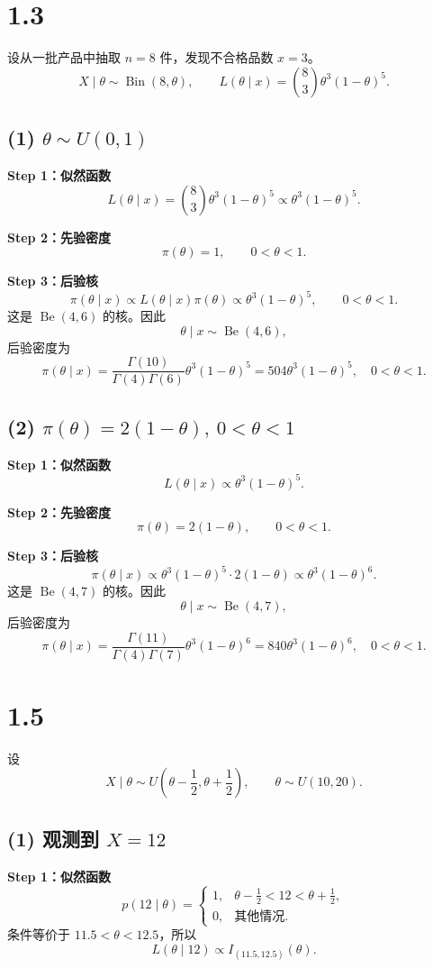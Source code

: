 \documentclass[UTF8,zihao=-4]{ctexart}
\begin{document}
\section*{1.3}
设从一批产品中抽取 \(n=8\) 件，发现不合格品数 \(x=3\)。
\[
X\mid\theta\sim\operatorname{Bin}(8,\theta),\qquad
L(\theta\mid x)=\binom{8}{3}\theta^3(1-\theta)^5.
\]

\subsection*{(1) \(\theta\sim U(0,1)\)}
\textbf{Step 1：似然函数}
\[
L(\theta\mid x)=\binom{8}{3}\theta^3(1-\theta)^5
\propto\theta^3(1-\theta)^5.
\]

\textbf{Step 2：先验密度}
\[
\pi(\theta)=1,\qquad0<\theta<1.
\]

\textbf{Step 3：后验核}
\[
\pi(\theta\mid x)\propto L(\theta\mid x)\pi(\theta)
\propto\theta^3(1-\theta)^5,\qquad0<\theta<1.
\]
这是 \(\operatorname{Be}(4,6)\) 的核。因此
\[
\boxed{\theta\mid x\sim\operatorname{Be}(4,6)},
\]
后验密度为
\[
\boxed{\pi(\theta\mid x)=\frac{\Gamma(10)}{\Gamma(4)\Gamma(6)}
\theta^3(1-\theta)^5=504\theta^3(1-\theta)^5,\quad0<\theta<1.}
\]

\subsection*{(2) \(\pi(\theta)=2(1-\theta),\ 0<\theta<1\)}
\textbf{Step 1：似然函数}
\[
L(\theta\mid x)\propto\theta^3(1-\theta)^5.
\]

\textbf{Step 2：先验密度}
\[
\pi(\theta)=2(1-\theta),\qquad0<\theta<1.
\]

\textbf{Step 3：后验核}
\[
\pi(\theta\mid x)\propto\theta^3(1-\theta)^5\cdot2(1-\theta)
\propto\theta^3(1-\theta)^6.
\]
这是 \(\operatorname{Be}(4,7)\) 的核。因此
\[
\boxed{\theta\mid x\sim\operatorname{Be}(4,7)},
\]
后验密度为
\[
\boxed{\pi(\theta\mid x)=\frac{\Gamma(11)}{\Gamma(4)\Gamma(7)}
\theta^3(1-\theta)^6=840\theta^3(1-\theta)^6,\quad0<\theta<1.}
\]

\section*{1.5}
设
\[
X\mid\theta\sim U\left(\theta-\frac12,\theta+\frac12\right),
\qquad\theta\sim U(10,20).
\]

\subsection*{(1) 观测到 \(X=12\)}
\textbf{Step 1：似然函数}
\[
p(12\mid\theta)=
\begin{cases}
1,&\theta-\frac12<12<\theta+\frac12,\\
0,&\text{其他情况}.
\end{cases}
\]
条件等价于 \(11.5<\theta<12.5\)，所以
\[
L(\theta\mid12)\propto I_{(11.5,12.5)}(\theta).
\]
\end{document}
